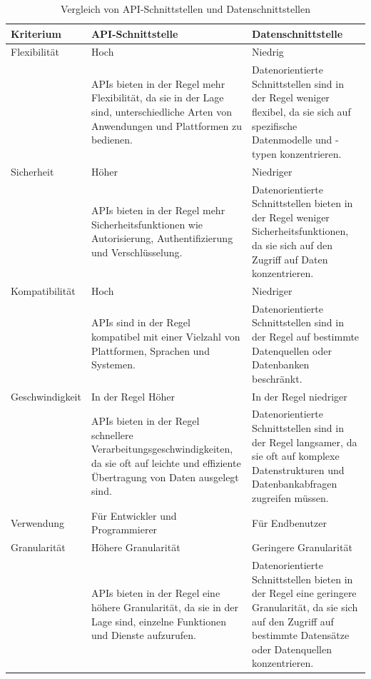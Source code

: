 \documentclass[notitlepage, hidelinks]{article}
\begin{document}
\begin{table}[h]
\begin{center}
\begin{tabular}{| L{3.1cm} | L{5.6cm} | L{5.6cm} |}
\hline
Kriterium & API-Schnittstelle & Datenschnittstelle \\ \hline
Flexibilität & Hoch & Niedrig \\ 
& APIs bieten in der Regel mehr Flexibilität, da sie in der Lage sind, unterschiedliche Arten von Anwendungen und Plattformen zu bedienen. & Datenorientierte Schnittstellen sind in der Regel weniger flexibel, da sie sich auf spezifische Datenmodelle und -typen konzentrieren. \\ \hline
Sicherheit & Höher & Niedriger \\ 
& APIs bieten in der Regel mehr Sicherheitsfunktionen wie Autorisierung, Authentifizierung und Verschlüsselung. & Datenorientierte Schnittstellen bieten in der Regel weniger Sicherheitsfunktionen, da sie sich auf den Zugriff auf Daten konzentrieren. \\ \hline
Kompatibilität & Hoch & Niedriger \\ 
& APIs sind in der Regel kompatibel mit einer Vielzahl von Plattformen, Sprachen und Systemen. & Datenorientierte Schnittstellen sind in der Regel auf bestimmte Datenquellen oder Datenbanken beschränkt. \\ \hline
Geschwindigkeit & In der Regel Höher & In der Regel niedriger \\ 
& APIs bieten in der Regel schnellere Verarbeitungsgeschwindigkeiten, da sie oft auf leichte und effiziente Übertragung von Daten ausgelegt sind. & Datenorientierte Schnittstellen sind in der Regel langsamer, da sie oft auf komplexe Datenstrukturen und Datenbankabfragen zugreifen müssen. \\ \hline
Verwendung & Für Entwickler und Programmierer & Für Endbenutzer \\ 
Granularität & Höhere Granularität & Geringere Granularität \\ 
& APIs bieten in der Regel eine höhere Granularität, da sie in der Lage sind, einzelne Funktionen und Dienste aufzurufen. & Datenorientierte Schnittstellen bieten in der Regel eine geringere Granularität, da sie sich auf den Zugriff auf bestimmte Datensätze oder Datenquellen konzentrieren. \\ \hline
\end{tabular}
\caption{Vergleich von API-Schnittstellen und Datenschnittstellen}
\label{tab:apis-vs-data-interfaces}
\end{center}
\end{table}
\end{document}
